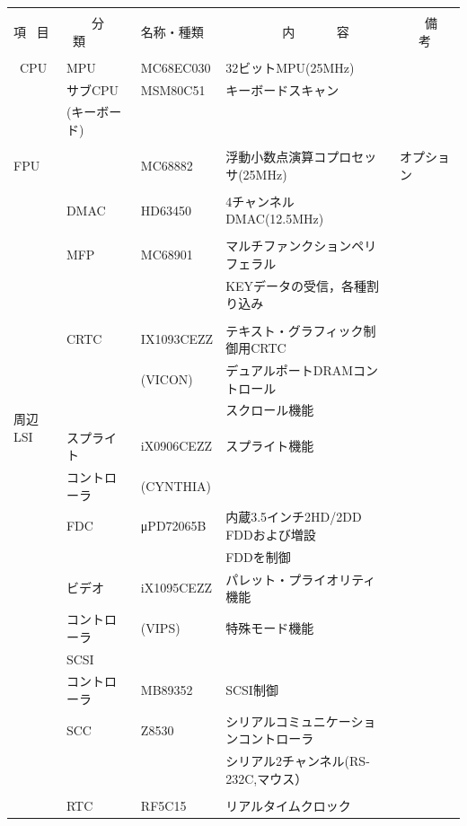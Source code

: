 ﻿\documentclass[twoside,a4paper,12pt]{article}
\begin{document}
\setlength{\tabcolsep}{0.5mm}
\begin{tabular}{|p{13mm}|p{25mm}|p{22mm}|p{73mm}|p{30mm}|}
\hline
& & & &\\[-2mm]
項 \ 目& \ \ \ \ 分 \ 類 & \ 名称・種類 & \ \ \ \ \ \ \ \ \ 内 \ \ \ \ \ \ 容 & \ \ \ \ 備 \ \ \ 考\\
\hline
& & & &\\[-3mm]
\ CPU & MPU & \ MC68EC030 & 32ビットMPU(25MHz) &\\
& サブCPU & \ MSM80C51 & キーボードスキャン &\\
& (キーボード) & & &\\
\hline
\multicolumn{2}{|l|}{} & & &\\[-4mm]
\multicolumn{2}{|l|}{FPU} & \ MC68882 & 浮動小数点演算コプロセッサ(25MHz) & オプション\\
\hline
\multirow{17}{13mm}{周辺 LSI} & & & &\\[-3mm]
& DMAC & \ HD63450 & 4チャンネルDMAC(12.5MHz) &\\
\cline{2-5}
& & & &\\[-3mm]
& MFP & \ MC68901 & マルチファンクションペリフェラル &\\
& & & KEYデータの受信，各種割り込み &\\
\cline{2-5}
& & & &\\[-3mm]
& CRTC & \ IX1093CEZZ & テキスト・グラフィック制御用CRTC &\\
& & \ (VICON) & デュアルポートDRAMコントロール &\\
& & & スクロール機能 &\\[3mm]
\cline{2-5}
& & & &\\[-1mm]
& スプライト & \ iX0906CEZZ & スプライト機能 &\\
& コントローラ & \ (CYNTHIA) & &\\
& FDC & \ μPD72065B & 内蔵3.5インチ2HD/2DD FDDおよび増設 &\\
& & & FDDを制御 &\\
& ビデオ & \ iX1095CEZZ & パレット・プライオリティ機能 &\\
& コントローラ & \ (VIPS) & 特殊モード機能 &\\
& SCSI & & &\\
& コントローラ & \ MB89352 & SCSI制御 &\\
& SCC & \ Z8530 & シリアルコミュニケーションコントローラ &\\
& & & シリアル2チャンネル(RS-232C,マウス） &\\
& & & &\\
& RTC & \ RF5C15 & リアルタイムクロック &\\

\end{tabular}
\end{document}

